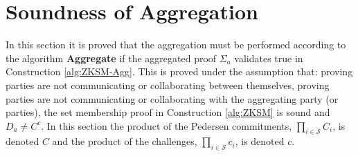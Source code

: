 \section{Soundness of Aggregation}
\label{sec:SecurityAggregation}
In this section it is proved that the aggregation must be performed according to the algorithm \textbf{Aggregate} if the aggregated proof $\Sigma_a$ validates true in Construction \ref{alg:ZKSM-Agg}. This is proved under the assumption that: proving parties are not communicating or collaborating between themselves, proving parties are not communicating or collaborating with the aggregating party (or parties), the set membership proof in Construction \ref{alg:ZKSM} is sound and $D_a\neq C^c$.  In this section the product of the Pedersen commitments, $\prod_{i\in\mathcal{S}}C_i$, is denoted $C$ and the product of the challenges, $\prod_{i\in\mathcal{S}} c_i$, is denoted $c$.


